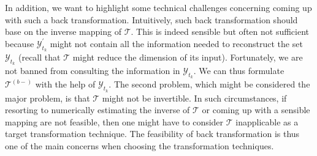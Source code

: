 In addition, we want to highlight some technical challenges concerning coming up with such a back transformation. Intuitively, such back transformation should base on the inverse mapping of $\mathcal{T}$. This is indeed sensible but often not sufficient because $\mathcal{Y}^{'}_{t_k}$ might not contain all the information needed to reconstruct the set $\mathcal{Y}_{t_k}$ (recall that $\mathcal{T}$ might reduce the dimension of its input). Fortunately, we are not banned from consulting the information in $\mathcal{Y}_{t_k}$. We can thus formulate $\mathcal{T}^{(b-)}$ with the help of $\mathcal{Y}_{t_k}$. The second problem, which might be considered the major problem, is that $\mathcal{T}$ might not be invertible. In such circumstances, if resorting to numerically estimating the inverse of $\mathcal{T}$ or coming up with a sensible mapping are not feasible, then one might have to consider $\mathcal{T}$ inapplicable as a target transformation technique. The feasibility of back transformation is thus one of the main concerns when choosing the transformation techniques.


